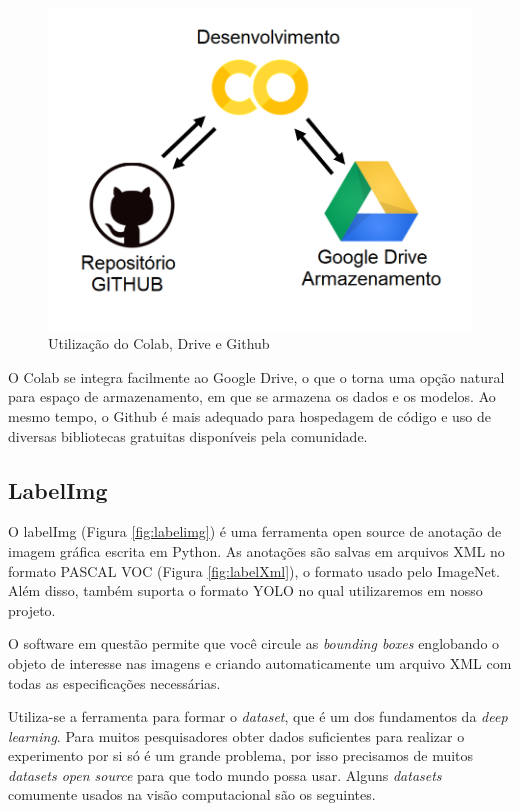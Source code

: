 \begin{figure}[htbp]
		\centering
		\includegraphics[scale=0.4]{figuras/MachineLearning/colabGithub.png}
		\caption{Utilização do Colab, Drive e Github}
		\label{fig:colabGithub}
\end{figure}

O Colab se integra facilmente ao Google Drive, o que o torna uma opção natural para espaço de armazenamento, em que se armazena os dados e os modelos. Ao mesmo tempo, o Github é mais adequado para hospedagem de código e uso de diversas  bibliotecas gratuitas disponíveis pela comunidade. 

\subsection{LabelImg}

O labelImg (Figura \ref{fig:labelimg}) é uma ferramenta open source de anotação de imagem gráfica escrita em Python. As anotações são salvas em arquivos XML no formato PASCAL VOC (Figura \ref{fig:labelXml}), o formato usado pelo ImageNet. Além disso, também suporta o formato YOLO no qual utilizaremos em nosso projeto. \cite{labelimg}

O software em questão permite que você circule as \textit{bounding boxes} englobando o objeto de interesse nas imagens e criando automaticamente um arquivo XML com todas as especificações necessárias.

Utiliza-se a ferramenta para formar o \textit{dataset}, que é um dos fundamentos da \textit{deep learning}. Para muitos pesquisadores obter dados suficientes para realizar o experimento por si só é um grande problema, por isso precisamos de muitos \textit{datasets open source} para que todo mundo possa usar. Alguns \textit{datasets} comumente usados na visão computacional são os seguintes.

